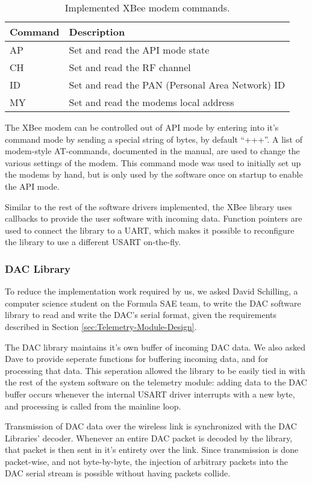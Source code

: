 \begin{table}
\caption{Implemented XBee modem commands.\label{tab:xbee_commands}}
\centering{}
\begin{tabular}{|l|l|}
\hline 
Command & Description \tabularnewline
\hline
\hline
AP & Set and read the API mode state \tabularnewline
\hline
CH & Set and read the RF channel \tabularnewline
\hline 
ID & Set and read the PAN (Personal Area Network) ID \tabularnewline
\hline
MY & Set and read the modems local address \tabularnewline
\hline
\end{tabular}
\end{table}

The XBee modem can be controlled out of API mode by entering into it's command mode by sending a special string of bytes, by default ``+++''. A list of modem-style AT-commands, documented in the manual, are used to change the various settings of the modem. This command mode was used to initially set up the modems by hand, but is only used by the software once on startup to enable the API mode.

Similar to the rest of the software drivers implemented, the XBee library uses callbacks to provide the user software with incoming data. Function pointers are used to connect the library to a UART, which makes it possible to reconfigure the library to use a different USART on-the-fly.

\subsubsection{DAC Library\label{sec:dac_library}}

To reduce the implementation work required by us, we asked David Schilling, a computer science student on the Formula SAE team, to write the DAC software library to read and write the DAC's serial format, given the requirements described in Section \ref{sec:Telemetry-Module-Design}.

The DAC library maintains it's own buffer of incoming DAC data. We also asked Dave to provide seperate functions for buffering incoming data, and for processing that data. This seperation allowed the library to be easily tied in with the rest of the system software on the telemetry module: adding data to the DAC buffer occurs whenever the internal USART driver interrupts with a new byte, and processing is called from the mainline loop.

Transmission of DAC data over the wireless link is synchronized with the DAC Libraries' decoder. Whenever an entire DAC packet is decoded by the library, that packet is then sent in it's entirety over the link. Since transmission is done packet-wise, and not byte-by-byte, the injection of arbitrary packets into the DAC serial stream is possible without having packets collide.

